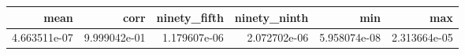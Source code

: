 \begin{tabular}{rrrrrr}
\toprule
mean & corr & ninety_fifth & ninety_ninth & min & max \\
\midrule
4.663511e-07 & 9.999042e-01 & 1.179607e-06 & 2.072702e-06 & 5.958074e-08 & 2.313664e-05 \\
\bottomrule
\end{tabular}
